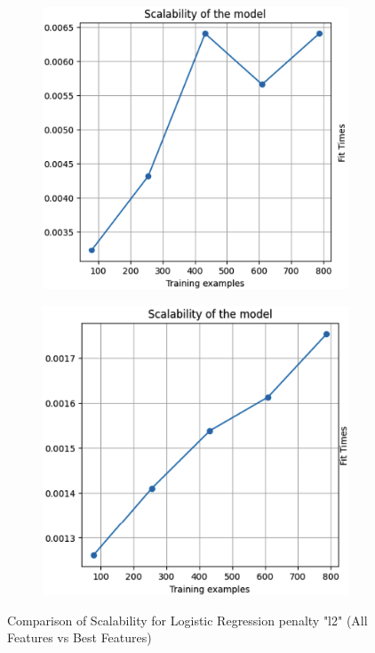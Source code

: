 \documentclass[conference]{IEEEtran}
\begin{document}
\begin{figure}[htbp]
    \centering
    \begin{subfigure}[b]{0.45\linewidth}
        \centering
        \includegraphics[width=\linewidth]{images/ScalabilityPenaltyAllFeatures.png}
        \label{fig:scalability-all}
    \end{subfigure}
    \hfill
    \begin{subfigure}[b]{0.45\linewidth}
        \centering
        \includegraphics[width=\linewidth]{images/ScalabilityPenaltyBestFeatures.png}
        \label{fig:scalability-best}
    \end{subfigure}
    \caption{Comparison of Scalability for Logistic Regression penalty "l2" (All Features vs Best Features)}
    \label{fig:scalability-comparison}
\end{figure}
\end{document}
